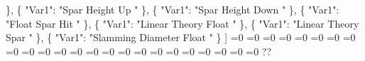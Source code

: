 {{      \}, %
      \{%
        "Var1": "Spar Height Up "%
      \}, %
      \{%
        "Var1": "Spar Height Down "%
      \}, %
      \{%
        "Var1": "Float Spar Hit "%
      \}, %
      \{%
        "Var1": "Linear Theory Float "%
      \}, %
      \{%
        "Var1": "Linear Theory Spar "%
      \}, %
      \{%
        "Var1": "Slamming Diameter Float "%
      \}%
    {]}}%
  \else%
    \ifnum{}=0%
      \let\resultsRE@I@out\resultsRE@II%
    \else%
      \ifnum{}=0%
      \let\resultsRE@I@out\resultsRE@III%
    \else%
      \ifnum{}=0%
      \let\resultsRE@I@out\resultsRE@IV%
    \else%
      \ifnum{}=0%
      \let\resultsRE@I@out\resultsRE@V%
    \else%
      \ifnum{}=0%
      \let\resultsRE@I@out\resultsRE@VI%
    \else%
      \ifnum{}=0%
      \let\resultsRE@I@out\resultsRE@VII%
    \else%
      \ifnum{}=0%
      \let\resultsRE@I@out\resultsRE@VIII%
    \else%
      \ifnum{}=0%
      \let\resultsRE@I@out\resultsRE@IX%
    \else%
      \ifnum{}=0%
      \let\resultsRE@I@out\resultsRE@X%
    \else%
      \ifnum{}=0%
      \let\resultsRE@I@out\resultsRE@XI%
    \else%
      \ifnum{}=0%
      \let\resultsRE@I@out\resultsRE@XII%
    \else%
      \ifnum{}=0%
      \let\resultsRE@I@out\resultsRE@XIII%
    \else%
      \ifnum{}=0%
      \let\resultsRE@I@out\resultsRE@XIV%
    \else%
      \ifnum{}=0%
      \let\resultsRE@I@out\resultsRE@XV%
    \else%
      \ifnum{}=0%
      \let\resultsRE@I@out\resultsRE@XVI%
    \else%
      \ifnum{}=0%
      \let\resultsRE@I@out\resultsRE@XVII%
    \else%
      \ifnum{}=0%
      \let\resultsRE@I@out\resultsRE@XVIII%
    \else%
      \ifnum{}=0%
      \let\resultsRE@I@out\resultsRE@XIX%
    \else%
      \ifnum{}=0%
      \let\resultsRE@I@out\resultsRE@XX%
    \else%
      \ifnum{}=0%
      \let\resultsRE@I@out\resultsRE@XXI%
    \else%
      \ifnum{}=0%
      \let\resultsRE@I@out\resultsRE@XXII%
    \else%
      \ifnum{}=0%
      \let\resultsRE@I@out\resultsRE@XXIII%
    \else%
      \ifnum{}=0%
      \let\resultsRE@I@out\resultsRE@XXIV%
    \else%
      \ifnum{}=0%
      \let\resultsRE@I@out\resultsRE@XXV%
    \else%
      \def\resultsRE@I@out{%
    ??}%
    \fi\fi\fi\fi\fi\fi\fi\fi\fi\fi\fi\fi\fi\fi\fi\fi\fi\fi\fi\fi\fi\fi\fi\fi
  \fi
  \resultsRE@I@out
}
